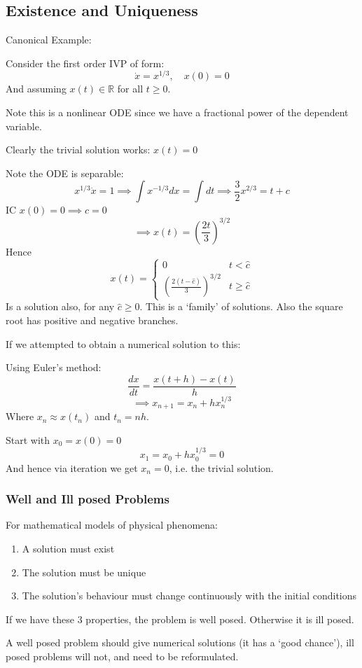 \documentclass{/home/janmebows/Documents/LatexTemplates/myassignment}
\begin{document}
\subsection{Existence and Uniqueness}
Canonical Example:

Consider the first order IVP of form:
\[\dot x = x^{1/3},\quad x(0) = 0\]
And assuming $x(t) \in \mathbb{R}$ for all $t\geq 0$.

Note this is a nonlinear ODE since we have a fractional power of the dependent variable.

Clearly the trivial solution works: $x(t) =0$

Note the ODE is separable:
\[x^{1/3} \dot x = 1 \implies \int x^{-1/3} dx = \int dt \implies \frac32 x^{2/3} = t+c\]
IC $x(0) = 0 \implies c=0$ 
\[\implies x(t) = \left(\frac{2t}{3}\right)^{3/2}\]
Hence
\[x(t) = \begin{cases}
    0& t < \hat c\\
    \left(\frac{2(t-\hat c)}{3}\right)^{3/2} & t\geq \hat c
\end{cases}\]
Is a solution also, for any $\hat c \geq 0$. This is a `family' of solutions. Also the square root has positive and negative branches.


If we attempted to obtain a numerical solution to this:

Using Euler's method:
\[\frac{dx}{dt} = \frac{x(t+h) - x(t)}{h}\]
\[\implies x_{n+1} = x_n + h x_n^{1/3}\]
Where $x_n \approx x(t_n)$ and $t_n = nh$.

Start with $x_0 = x(0) =0$
\[x_1 = x_0 + hx_0^{1/3} =0\]
And hence via iteration we get $x_n = 0$, i.e. the trivial solution.

\subsubsection{Well and Ill posed Problems}
For mathematical models of physical phenomena:
\begin{enumerate}
    \item A solution must exist
    \item The solution must be unique
    \item The solution's behaviour must change continuously with the initial conditions 
\end{enumerate}
If we have these 3 properties, the problem is well posed. Otherwise it is ill posed.

A well posed problem should give numerical solutions (it has a `good chance'), ill posed problems will not, and need to be reformulated.
\end{document}
